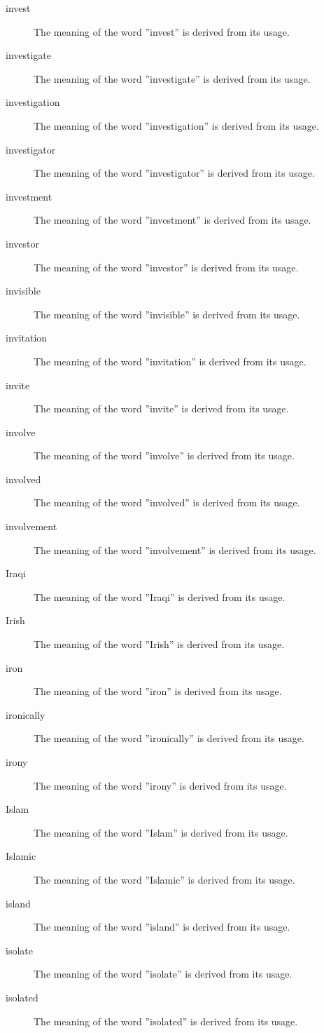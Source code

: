 \documentclass[12pt, letterpaper]{memoir}
\begin{document}
\begin{description}
\item[invest] The meaning of the word ''invest'' is derived from its usage.
\item[investigate] The meaning of the word ''investigate'' is derived from its usage.
\item[investigation] The meaning of the word ''investigation'' is derived from its usage.
\item[investigator] The meaning of the word ''investigator'' is derived from its usage.
\item[investment] The meaning of the word ''investment'' is derived from its usage.
\item[investor] The meaning of the word ''investor'' is derived from its usage.
\item[invisible] The meaning of the word ''invisible'' is derived from its usage.
\item[invitation] The meaning of the word ''invitation'' is derived from its usage.
\item[invite] The meaning of the word ''invite'' is derived from its usage.
\item[involve] The meaning of the word ''involve'' is derived from its usage.
\item[involved] The meaning of the word ''involved'' is derived from its usage.
\item[involvement] The meaning of the word ''involvement'' is derived from its usage.
\item[Iraqi] The meaning of the word ''Iraqi'' is derived from its usage.
\item[Irish] The meaning of the word ''Irish'' is derived from its usage.
\item[iron] The meaning of the word ''iron'' is derived from its usage.
\item[ironically] The meaning of the word ''ironically'' is derived from its usage.
\item[irony] The meaning of the word ''irony'' is derived from its usage.
\item[Islam] The meaning of the word ''Islam'' is derived from its usage.
\item[Islamic] The meaning of the word ''Islamic'' is derived from its usage.
\item[island] The meaning of the word ''island'' is derived from its usage.
\item[isolate] The meaning of the word ''isolate'' is derived from its usage.
\item[isolated] The meaning of the word ''isolated'' is derived from its usage.

\end{description}
\end{document}
